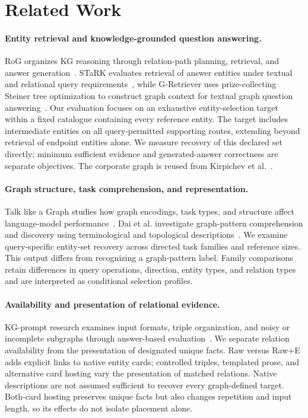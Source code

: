 \section{Related Work}
\label{sec:related}

\paragraph{Entity retrieval and knowledge-grounded question answering.}
RoG organizes KG reasoning through relation-path planning, retrieval, and answer generation~\cite{luo2024rog}. STaRK evaluates retrieval of answer entities under textual and relational query requirements~\cite{wu2024stark}, while G-Retriever uses prize-collecting Steiner tree optimization to construct graph context for textual graph question answering~\cite{he2024gretriever}. Our evaluation focuses on an exhaustive entity-selection target within a fixed catalogue containing every reference entity. The target includes intermediate entities on all query-permitted supporting routes, extending beyond retrieval of endpoint entities alone. We measure recovery of this declared set directly; minimum sufficient evidence and generated-answer correctness are separate objectives. The corporate graph is reused from Kirpichev et al.~\cite{kirpichev2026towards}.

\paragraph{Graph structure, task comprehension, and representation.}
Talk like a Graph studies how graph encodings, task types, and structure affect language-model performance~\cite{fatemi2024talklikegraph}. Dai et al. investigate graph-pattern comprehension and discovery using terminological and topological descriptions~\cite{dai2025graphpatterns}. We examine query-specific entity-set recovery across directed task families and reference sizes. This output differs from recognizing a graph-pattern label. Family comparisons retain differences in query operations, direction, entity types, and relation types and are interpreted as conditional selection profiles.

\paragraph{Availability and presentation of relational evidence.}
KG-prompt research examines input formats, triple organization, and noisy or incomplete subgraphs through answer-based evaluation~\cite{dai2024kgunderstanding}. We separate relation availability from the presentation of designated unique facts. Raw versus Raw+E adds explicit links to native entity cards; controlled triples, templated prose, and alternative card hosting vary the presentation of matched relations. Native descriptions are not assumed sufficient to recover every graph-defined target. Both-card hosting preserves unique facts but also changes repetition and input length, so its effects do not isolate placement alone.

